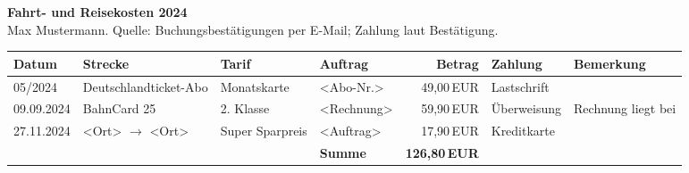 \documentclass[10pt,a4paper,landscape]{article}
\begin{document}
{\Large\bfseries Fahrt- und Reisekosten 2024}\\[2mm]
Max Mustermann. Quelle: Buchungsbestätigungen per E-Mail; Zahlung laut Bestätigung.\\[4mm]
\begin{longtable}{llllrll}\toprule
Datum & Strecke & Tarif & Auftrag & Betrag & Zahlung & Bemerkung\\\midrule
05/2024 & Deutschlandticket-Abo & Monatskarte & <Abo-Nr.> & 49,00\,EUR & Lastschrift & \\
09.09.2024 & BahnCard 25 & 2. Klasse & <Rechnung> & 59,90\,EUR & Überweisung & Rechnung liegt bei \\
27.11.2024 & <Ort> $\to$ <Ort> & Super Sparpreis & <Auftrag> & 17,90\,EUR & Kreditkarte & \\
\midrule & & & \textbf{Summe} & \textbf{126,80\,EUR} & & \\\bottomrule
\end{longtable}
\end{document}
